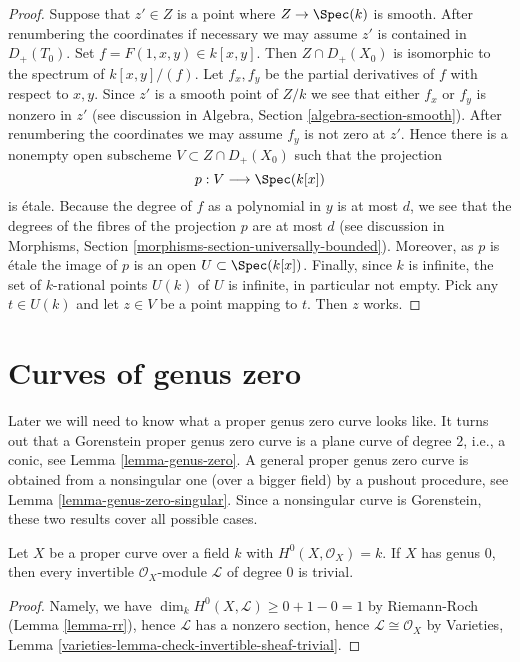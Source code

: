 \begin{proof}
Suppose that $z' \in Z$ is a point where $Z \to \Spec(k)$ is smooth.
After renumbering the coordinates if necessary we may assume
$z'$ is contained in $D_+(T_0)$. Set $f = F(1, x, y) \in k[x, y]$.
Then $Z \cap D_+(X_0)$ is isomorphic to the spectrum of $k[x, y]/(f)$.
Let $f_x, f_y$ be the partial derivatives of $f$ with respect to
$x, y$. Since $z'$ is a smooth point of $Z/k$ we see that either
$f_x$ or $f_y$ is nonzero in $z'$ (see discussion in
Algebra, Section \ref{algebra-section-smooth}).
After renumbering the coordinates
we may assume $f_y$ is not zero at $z'$. Hence there is a nonempty
open subscheme $V \subset Z \cap D_{+}(X_0)$ such that the
projection
$$
p : V \longrightarrow \Spec(k[x])
$$
is \'etale. Because the degree of $f$ as a polynomial in $y$
is at most $d$, we see that the degrees of the fibres of the
projection $p$ are at most $d$ (see discussion in
Morphisms, Section \ref{morphisms-section-universally-bounded}).
Moreover, as $p$ is \'etale
the image of $p$ is an open $U \subset \Spec(k[x])$.
Finally, since $k$ is infinite, the set of $k$-rational points
$U(k)$ of $U$ is infinite, in particular not empty. Pick any
$t \in U(k)$ and let $z \in V$ be a point mapping to $t$.
Then $z$ works.
\end{proof}





\section{Curves of genus zero}
\label{section-genus-zero}

\noindent
Later we will need to know what a proper genus zero curve looks like.
It turns out that a Gorenstein proper genus zero curve is a plane
curve of degree $2$, i.e., a conic, see Lemma \ref{lemma-genus-zero}.
A general proper genus zero curve is obtained from a nonsingular one
(over a bigger field) by a pushout procedure, see
Lemma \ref{lemma-genus-zero-singular}.
Since a nonsingular curve is Gorenstein, these two results
cover all possible cases.

\begin{lemma}
\label{lemma-genus-zero-pic}
Let $X$ be a proper curve over a field $k$ with $H^0(X, \mathcal{O}_X) = k$.
If $X$ has genus $0$, then every invertible $\mathcal{O}_X$-module
$\mathcal{L}$ of degree $0$ is trivial.
\end{lemma}

\begin{proof}
Namely, we have $\dim_k H^0(X, \mathcal{L}) \geq 0 + 1 - 0 = 1$
by Riemann-Roch (Lemma \ref{lemma-rr}), hence $\mathcal{L}$ has a
nonzero section, hence $\mathcal{L} \cong \mathcal{O}_X$ by
Varieties, Lemma \ref{varieties-lemma-check-invertible-sheaf-trivial}.
\end{proof}

